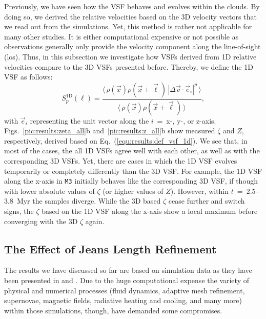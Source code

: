 Previously, we have seen how the VSF behaves and evolves within the clouds.
By doing so, we derived the relative velocities based on the 3D velocity vectors that we read out from the simulations.
Yet, this method is rather not applicable for many other studies. 
It is either computational expensive or not possible as observations generally only provide the velocity component along the line-of-sight (los).
Thus, in this subsection we investigate how VSFs derived from 1D relative velocities compare to the 3D VSFs presented before.
Thereby, we define the 1D VSF as follows:
\begin{equation}
	\mathit{S}_p^\mathrm{1D} (\ell) = \frac{\langle \, \rho(\vec{x}) \rho(\vec{x}+\vec{\ell}) \, |\Delta \vec{v} \cdot \vec{e}_i|^p  \, \rangle}{\langle  \, \rho(\vec{x}) \rho(\vec{x}+\vec{\ell}) \, \rangle} ,
    \label{equ:results:def_vsf_1d}
\end{equation}
with $\vec{e}_i$ representing the unit vector along the $i$~=~x-, y-, or z-axis.
Figs.~\ref{pic:results:zeta_all}b and~\ref{pic:results:z_all}b show measured $\zeta$ and $Z$, respectively, derived based on Eq.~(\ref{equ:results:def_vsf_1d}). 
We see that, in most of the cases, the all 1D VSFs agree well with each other, as well as with the corresponding 3D VSFs.
Yet, there are cases in which the 1D VSF evolves temporarily or completely differently than the 3D VSF.
For example, the 1D VSF along the x-axis in \texttt{M3} initially behaves like the corresponding 3D VSF, if though with lower absolute values of $\zeta$ (or higher values of $Z$).
However, within $t$~=~2.5--3.8~Myr the samples diverge. 
While the 3D based $\zeta$ cease further and switch signs, the $\zeta$ based on the 1D VSF along the x-axis show a local maximum before converging with the 3D $\zeta$ again. 


\subsection{The Effect of Jeans Length Refinement}\label{results:refinement}

The results we have discussed so far are based on simulation data as they have been presented in  and .
Due to the huge computational expense the variety of physical and numerical processes (fluid dynamics, adaptive mesh refinement, supernovae, magnetic fields, radiative heating and cooling, and many more) within those simulations, though, have demanded some compromises.

